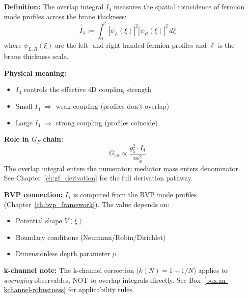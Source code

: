
\begin{tcolorbox}[colback=green!5!white, colframe=green!50!black,
    title=\textbf{Canonical Definition: Overlap Integral $I_4$}]
\label{box:overlap-integral-canon}

\textbf{Definition:} The overlap integral $I_4$ measures the spatial coincidence
of fermion mode profiles across the brane thickness:
\begin{equation}
I_4 := \int_0^\ell |\psi_L(\xi)|^2 |\psi_R(\xi)|^2 \, d\xi
\label{eq:I4-canon-def}
\end{equation}
where $\psi_{L,R}(\xi)$ are the left- and right-handed fermion profiles
and $\ell$ is the brane thickness scale.

\textbf{Physical meaning:}
\begin{itemize}[nosep]
\item $I_4$ controls the effective 4D coupling strength
\item Small $I_4$ $\Rightarrow$ weak coupling (profiles don't overlap)
\item Large $I_4$ $\Rightarrow$ strong coupling (profiles coincide)
\end{itemize}

\textbf{Role in $G_F$ chain:}
\begin{equation}
G_{\text{eff}} \propto \frac{g_5^2 \cdot I_4}{m_\phi^2}
\end{equation}
The overlap integral enters the numerator; mediator mass enters denominator.
See Chapter~\ref{ch:gf_derivation} for the full derivation pathway.

\textbf{BVP connection:} $I_4$ is computed from the BVP mode profiles
(Chapter~\ref{ch:bvp_framework}). The value depends on:
\begin{itemize}[nosep]
\item Potential shape $V(\xi)$
\item Boundary conditions (Neumann/Robin/Dirichlet)
\item Dimensionless depth parameter $\mu$
\end{itemize}

\textbf{k-channel note:} The k-channel correction ($k(N) = 1 + 1/N$) applies
to \emph{averaging} observables, NOT to overlap integrals directly.
See Box~\ref{box:zn-kchannel-robustness} for applicability rules.

\end{tcolorbox}
